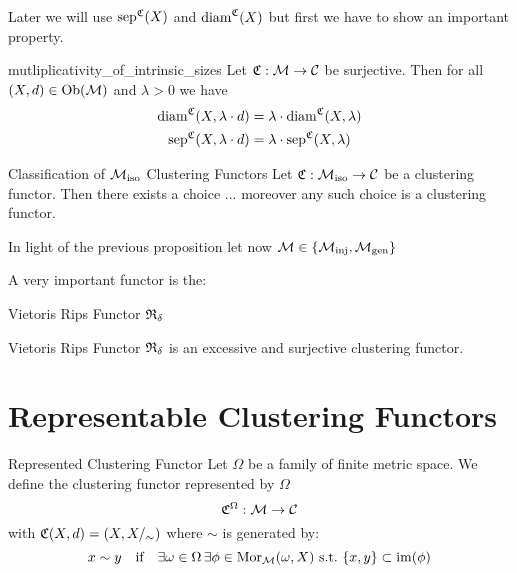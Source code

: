 Later we will use $\mathrm{sep}^{\mathfrak{C}}(X)$ and $\mathrm{diam}^{\mathfrak{C}}(X)$ but first we have to show an important property.

\begin{lemma}{}{mutliplicativity_of_intrinsic_sizes}
Let $\mathfrak{C}: \mathcal{M} \to \mathcal{C}$ be surjective. Then for all $(X,d) \in \mathrm {Ob}(\mathcal{M})$ and $\lambda > 0$ we have
\begin{align*}{}{}
    \mathrm{diam}^{\mathfrak{C}}(X,\lambda \cdot d) &= \lambda \cdot \mathrm{diam}^{\mathfrak{C}}(X,\lambda) \\
    \mathrm{sep}^{\mathfrak{C}}(X,\lambda \cdot d) &= \lambda \cdot \mathrm{sep}^{\mathfrak{C}}(X,\lambda)
\end{align*}
 \end{lemma}





\begin{proposition}{Classification of ${\mathcal{M}_\mathrm{iso}}$ Clustering Functors}{}
Let $\mathfrak{C}: {\mathcal{M}_\mathrm{iso}} \to \mathcal{C}$ be a clustering functor. Then there exists a choice ... moreover any such choice is a clustering functor.
\end{proposition}
In light of the previous proposition let now $\mathcal{M} \in \{{\mathcal{M}_\mathrm{inj}}, {\mathcal{M}_\mathrm{gen}}\}$


A very important functor is the:
\begin{definition}{Vietoris Rips Functor}{}
$\mathfrak{R}_\delta$
\end{definition}




\begin{proposition}{Vietoris Rips Functor}{}
$\mathfrak{R}_\delta$ is an excessive and surjective clustering functor.
\end{proposition}

\section{Representable Clustering Functors}

\begin{definition}{Represented Clustering Functor}{}
Let $\Omega$ be a family of finite metric space. We define the clustering functor represented by $\Omega$
$$
\mathfrak{C}^\Omega: \mathcal{M} \to \mathcal{C}
$$
with $\mathfrak{C}(X,d) = (X, X/_\sim)$ where $\sim$ is generated by:
\begin{equation}
\label{eq:represented_clustering_functor_condition}
x \sim y \quad \text{if} \quad \exists \omega \in \Omega \,\exists \phi \in \mathrm {Mor}_{\mathcal{M}}(\omega, X) \ \text{s.t.} \ \{x,y\} \subset \operatorname*{im}(\phi)
\end{equation}
\end{definition}

